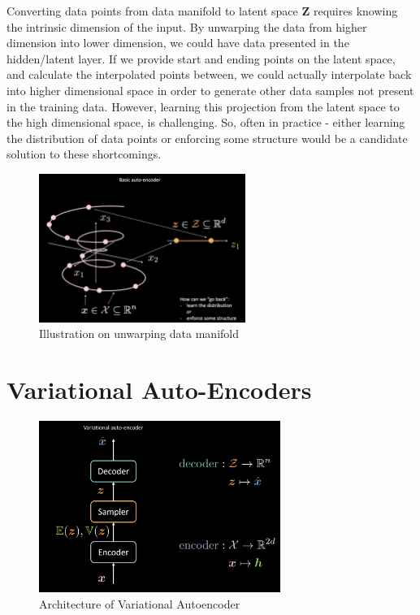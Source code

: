 Converting data points from data manifold to latent space \textbf{Z} requires knowing the intrinsic dimension of the input. By unwarping the data from higher dimension into lower dimension, we could have data presented in the hidden/latent layer. If we provide start and ending points on the latent space, and calculate the interpolated points between, we could actually interpolate back into higher dimensional space in order to generate other data samples not present in the training data. However, learning this projection from the latent space to the high dimensional space, is challenging. So, often in practice - either learning the distribution of data points or enforcing some structure would be a candidate solution to these shortcomings.

\begin{figure}[htb]
    \centering
    \includegraphics[width=0.6\textwidth]{figs/Data_manifold.png}
    \caption{Illustration on unwarping data manifold}
    \label{fig:Data_manifold}
\end{figure}

\section{Variational Auto-Encoders}
\begin{figure}[H]
    \centering
    \includegraphics[width=0.7\textwidth]{figs/vae.png}
    \caption{Architecture of Variational Autoencoder}
    \label{fig:vae}
\end{figure}

